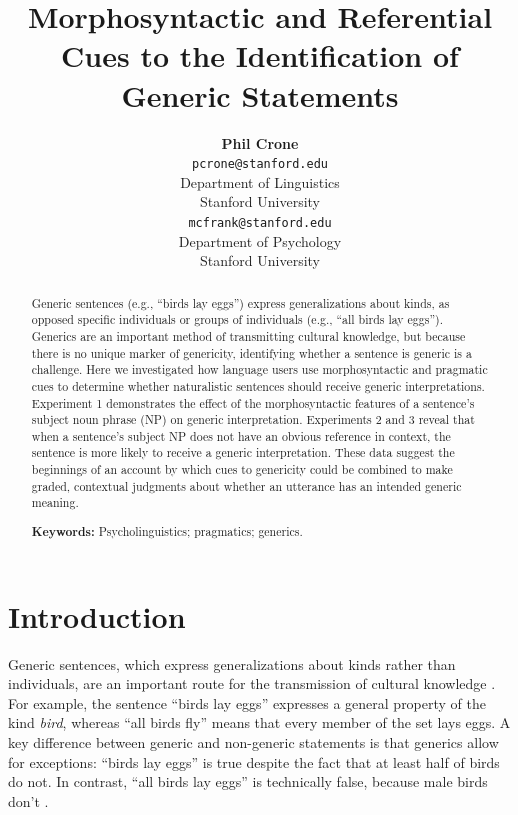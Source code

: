 \documentclass[10pt,letterpaper]{article}
\title{Morphosyntactic and Referential Cues to the Identification of Generic Statements}
\author{{\large \bf Phil Crone} \\
	\texttt{pcrone@stanford.edu}\\
  Department of Linguistics \\
  Stanford University
  \And {\large \bf Michael C. Frank} \\
  \texttt{mcfrank@stanford.edu}\\
  Department of Psychology \\
  Stanford University}
\begin{document}
\maketitle

\begin{abstract}
Generic sentences (e.g., ``birds lay eggs'') express generalizations about kinds, as opposed specific individuals or groups of individuals (e.g., ``all birds lay eggs''). Generics are an important method of transmitting cultural knowledge, but because there is no unique marker of genericity, identifying whether a sentence is generic is a challenge. Here we investigated how language users use morphosyntactic and pragmatic cues to determine whether naturalistic sentences should receive generic interpretations. Experiment 1 demonstrates the effect of the morphosyntactic features of a sentence's subject noun phrase (NP) on generic interpretation. Experiments 2 and 3 reveal that when a sentence's subject NP does not have an obvious reference in context, the sentence is more likely to receive a generic interpretation. These data suggest the beginnings of an account by which cues to genericity could be combined to make graded, contextual judgments about whether an utterance has an intended generic meaning.

\textbf{Keywords:} Psycholinguistics; pragmatics; generics.
\end{abstract}


\section{Introduction}


Generic sentences, which express generalizations about kinds rather than individuals, are an important route for the transmission of cultural knowledge \cite{gelman2003}. For example, the sentence ``birds lay eggs'' expresses a general property of the kind \textit{bird}, whereas ``all birds fly'' means that every member of the set lays eggs. A key difference between generic and non-generic statements is that generics allow for exceptions: ``birds lay eggs'' is true despite the fact that at least half of birds do not. In contrast, ``all birds lay eggs'' is technically false, because male birds don't \cite{Prasada:2000}. 
\end{document}
